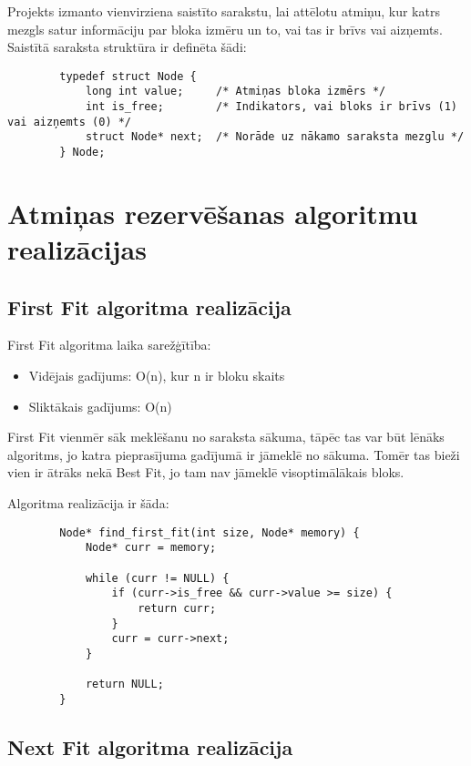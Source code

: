\documentclass{report}
\begin{document}
	Projekts izmanto vienvirziena saistīto sarakstu, lai attēlotu atmiņu, kur katrs mezgls satur informāciju par bloka izmēru un to, vai tas ir brīvs vai aizņemts. Saistītā saraksta struktūra ir definēta šādi:
	
	\begin{verbatim}
		typedef struct Node {
			long int value;     /* Atmiņas bloka izmērs */
			int is_free;        /* Indikators, vai bloks ir brīvs (1) vai aizņemts (0) */
			struct Node* next;  /* Norāde uz nākamo saraksta mezglu */
		} Node;
	\end{verbatim}
	
	\section{Atmiņas rezervēšanas algoritmu realizācijas}
	
	\subsection{First Fit algoritma realizācija}
	
	First Fit algoritma laika sarežģītība:
	\begin{itemize}
		\item Vidējais gadījums: O(n), kur n ir bloku skaits
		\item Sliktākais gadījums: O(n)
	\end{itemize}
	
	First Fit vienmēr sāk meklēšanu no saraksta sākuma, tāpēc tas var būt lēnāks algoritms, jo katra pieprasījuma gadījumā ir jāmeklē no sākuma. Tomēr tas bieži vien ir ātrāks nekā Best Fit, jo tam nav jāmeklē visoptimālākais bloks.
	
	Algoritma realizācija ir šāda:
	
	\begin{verbatim}
		Node* find_first_fit(int size, Node* memory) {
			Node* curr = memory;
			
			while (curr != NULL) {
				if (curr->is_free && curr->value >= size) {
					return curr;
				}
				curr = curr->next;
			}
			
			return NULL; 
		}
	\end{verbatim}
	
	\subsection{Next Fit algoritma realizācija}
	
\end{document}
